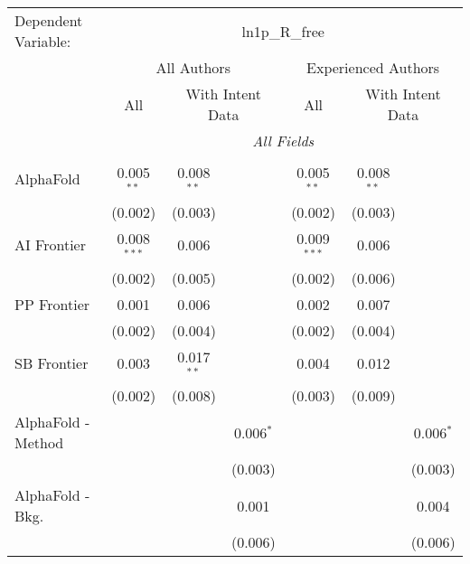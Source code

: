 \begingroup
\centering
\begin{tabular}{lcccccc}
   \tabularnewline \midrule \midrule
   Dependent Variable: & \multicolumn{6}{c}{ln1p\_R\_free}\\
 & \multicolumn{3}{c}{All Authors} & \multicolumn{3}{c}{Experienced Authors} \\
\cmidrule(lr){2-4} \cmidrule(lr){5-7}
 & \multicolumn{1}{c}{All} & \multicolumn{2}{c}{With Intent Data} & \multicolumn{1}{c}{All} & \multicolumn{2}{c}{With Intent Data} \\
\cmidrule(lr){2-2} \cmidrule(lr){3-4} \cmidrule(lr){5-5} \cmidrule(lr){6-7}
 & \multicolumn{6}{c}{\textit{All Fields}} \\ \\
   AlphaFold            & 0.005$^{**}$  & 0.008$^{**}$ &                & 0.005$^{**}$  & 0.008$^{**}$ &   \\   
                        & (0.002)       & (0.003)      &                & (0.002)       & (0.003)      &   \\   
   AI Frontier          & 0.008$^{***}$ & 0.006        &                & 0.009$^{***}$ & 0.006        &   \\   
                        & (0.002)       & (0.005)      &                & (0.002)       & (0.006)      &   \\   
   PP Frontier          & 0.001         & 0.006        &                & 0.002         & 0.007        &   \\   
                        & (0.002)       & (0.004)      &                & (0.002)       & (0.004)      &   \\   
   SB Frontier          & 0.003         & 0.017$^{**}$ &                & 0.004         & 0.012        &   \\   
                        & (0.002)       & (0.008)      &                & (0.003)       & (0.009)      &   \\   
   AlphaFold - Method   &               &              & 0.006$^{*}$    &               &              & 0.006$^{*}$\\   
                        &               &              & (0.003)        &               &              & (0.003)\\   
   AlphaFold - Bkg.     &               &              & 0.001          &               &              & 0.004\\   
                        &               &              & (0.006)        &               &              & (0.006)\\   

\end{tabular}
